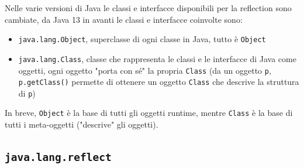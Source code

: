 Nelle varie versioni di Java le classi e interfacce disponibili per la reflection sono cambiate, da Java 13 in avanti le classi e interfacce coinvolte sono:
\begin{itemize}
	\item \texttt{java.lang.Object}, superclasse di ogni classe in Java, tutto è \texttt{Object}

	\item \texttt{java.lang.Class}, classe che rappresenta le classi e le interfacce di Java come oggetti, ogni oggetto "porta con sé" la propria \texttt{Class} (da un oggetto \texttt{p}, \texttt{p.getClass()} permette di ottenere un oggetto \texttt{Class} che descrive la struttura di \texttt{p})
\end{itemize}
In breve, \texttt{Object} è la base di tutti gli oggetti runtime, mentre \texttt{Class} è la base di tutti i meta-oggetti ("descrive" gli oggetti).

\subsection{\texttt{java.lang.reflect}}

